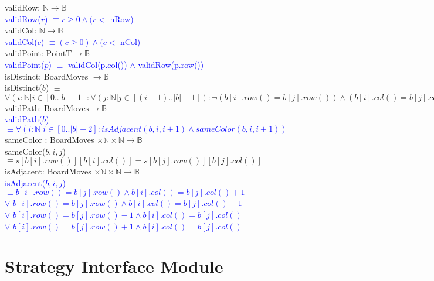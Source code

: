 \documentclass[12pt]{article}
\begin{document}
\noindent validRow: $\mathbb{N} \rightarrow \mathbb{B}$\\
\noindent \textcolor{blue}{validRow($r$) $\equiv r \geq 0 \land (r < $ nRow)} \\

\noindent validCol: $\mathbb{N} \rightarrow \mathbb{B}$\\
\noindent \textcolor{blue}{validCol($c$) $\equiv (c \geq 0) \land (c < $ nCol)} \\


\noindent validPoint: $\mbox{PointT} \rightarrow \mathbb{B}$\\
\noindent \textcolor{blue}{validPoint($p$) $\equiv$ validCol(p.col()) $\land$ validRow(p.row())}\\

\noindent isDistinct: BoardMoves $\rightarrow \mathbb{B}$\\
\noindent isDistinct($b$) $\equiv$ $\forall(i : \mathbb{N}| i \in [0..|b|-1] : \forall (j : \mathbb{N} | j \in [(i+1)..|b|-1]) : \lnot (b[i].row() = b[j].row()) \land (b[i].col() = b[j].col()) )$  \\


\noindent validPath: $\mbox{BoardMoves} \rightarrow \mathbb{B}$\\
\noindent \textcolor{blue}{validPath($b$) $\equiv \forall(i : \mathbb{N} | i \in [0..|b|-2] : isAdjacent(b,i,i+1) \land sameColor(b,i,i+1)) $}\\
 
\noindent sameColor : BoardMoves $\times \mathbb{N} \times \mathbb{N} \rightarrow \mathbb{B} $\\
\noindent sameColor($b,i,j$) $\equiv s[b[i].row()][b[i].col()] = s[b[j].row()][b[j].col()]$\\

\noindent isAdjacent: BoardMoves $\times \mathbb{N} \times \mathbb{N} \rightarrow \mathbb{B}$\\
\noindent \textcolor{blue}{isAdjacent($b,i,j$) $\equiv b[i].row() = b[j].row() \land b[i].col() = b[j].col() + 1$\\
$\lor$  $b[i].row() = b[j].row() \land b[i].col() = b[j].col() - 1$\\
$\lor$  $b[i].row() = b[j].row() - 1 \land b[i].col() = b[j].col()$\\
$\lor$  $b[i].row() = b[j].row() + 1 \land b[i].col() = b[j].col()$ }\\


\newpage

\section* {Strategy Interface Module}
\end{document}
